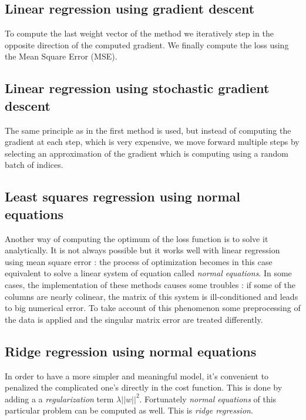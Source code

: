 \documentclass[10pt,conference,compsocconf]{IEEEtran}
\begin{document}
\subsection{Linear regression using gradient descent}
To compute the last weight vector of the method we iteratively step in the opposite direction of the computed gradient. We finally compute the loss using the Mean Square Error (MSE).

\subsection{Linear regression using stochastic gradient descent}
The same principle as in the first method is used, but instead of computing the gradient at each step, which is very expensive, we move forward multiple steps by selecting an approximation of the gradient which is computing using a random batch of indices.

\subsection{Least squares regression using normal equations}
Another way of computing the optimum of the loss function is to solve it analytically. It is not always possible but it works well with linear regression using mean square error : the process of optimization becomes in this case equivalent to solve a linear system of equation called \textit{normal equations}. In some cases, the implementation of these methods causes some troubles : if some of the columns are nearly colinear, the matrix of this system is ill-conditioned and leads to big numerical error. To take account of this phenomenon some preprocessing of the data is applied and the singular matrix error are treated differently. 

\subsection{Ridge regression using normal equations}
In order to have a more simpler and meaningful model, it's convenient to penalized the complicated one's directly in the cost function. This is done by adding a a \textit{regularization} term $\lambda \vert\vert w \vert\vert ^2$. Fortunately \textit{normal equations} of this particular problem can be computed as well. This is \textit{ridge regression}.
\end{document}
